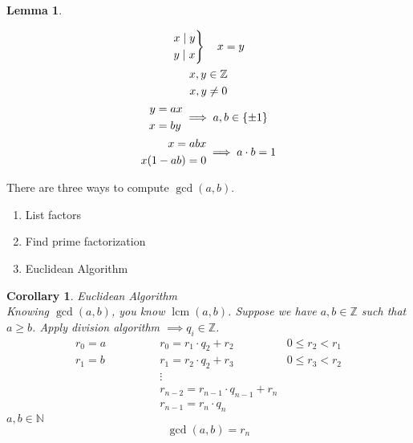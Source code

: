 \documentclass[letterpaper, 12pt]{article}
\newtheorem{lemma}[theorem]{Lemma}
\newtheorem{corollary}[theorem]{Corollary}
\newenvironment{proof}[1][Proof]{\begin{trivlist}
\item[\hskip \labelsep {\bfseries #1}]}{\end{trivlist}}
\DeclareMathOperator{\lcm}{lcm}
\newcommand{\N}{\mathbb{N}}
\newcommand{\Z}{\mathbb{Z}}
\newcommand{\0}{\emptyset}
\begin{document}
\begin{lemma}
\begin{proof}
\begin{gather*}
                \begin{rcases*}
                    x \mid y \\
                    y \mid x
                \end{rcases*} \quad x = y \\
                x, y \in \Z \\
                x, y \ne 0 \\
                \begin{aligned}
                    y &= ax \\
                    x &= by
                \end{aligned} \implies a, b \in \{\pm 1\} \\
                \begin{aligned}
                    x = abx \\
                    x(1 - ab) = 0
                \end{aligned} \implies a \cdot b = 1
            \end{gather*}
        \end{proof}
    \end{lemma}
    There are three ways to compute $\gcd(a, b)$.
    \begin{enumerate}
        \item List factors
        \item Find prime factorization
        \item Euclidean Algorithm
    \end{enumerate}
    \begin{corollary}
        Euclidean Algorithm \\
        Knowing $\gcd(a, b)$, you know $\lcm(a, b)$.
        Suppose we have $a, b \in \Z$ such that $a \ge b$. 
        Apply division algorithm $\implies q_i \in \Z$.
        \begin{align*}
            r_0 = a &\qquad\qquad r_0 = r_1 \cdot q_2 + r_2 & 0 \le r_2 < r_1 \\
            r_1 = b &\qquad\qquad r_1 = r_2 \cdot q_2 + r_3 & 0 \le r_3 < r_2 \\
            &\qquad\qquad \vdots \\
            &\qquad\qquad r_{n-2} = r_{n-1} \cdot q_{n-1} + r_n \\
            &\qquad\qquad r_{n-1} = r_n \cdot q_n
        \end{align*}
        $a, b \in \N$
        \[\gcd(a, b) = r_n\]
    \end{corollary}
\end{document}
